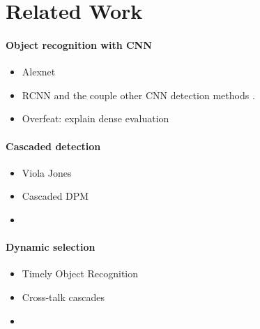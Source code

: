 \section{Related Work}\label{sec:related}

\paragraph{Object recognition with CNN}\label{object-recognition-with-cnn}

\begin{itemize}
\itemsep1pt\parskip0pt
\item
  Alexnet \cite{Krizhevsky-NIPS-2012}
\item
  RCNN \cite{Girshick-CVPR-2014} and the couple other CNN detection methods \cite{Zou-CVPR-2014} \cite{Simonyan-ICLR-2014}.
\item
  Overfeat: explain dense evaluation \cite{Sermanet-ICLR-2014}
\end{itemize}

\paragraph{Cascaded detection}\label{cascaded-detection}

\begin{itemize}
\itemsep1pt\parskip0pt
\item
  Viola Jones \cite{Viola2004}
\item
  Cascaded DPM \cite{Felzenszwalb-CVPR-2010}
\item
\end{itemize}

\paragraph{Dynamic selection}\label{dynamic-selection}

\begin{itemize}
\itemsep1pt\parskip0pt
\item
  Timely Object Recognition \cite{Karayev-NIPS-2012}
\item
  Cross-talk cascades \cite{Dollar-ECCV-2012}
\item
\end{itemize}


